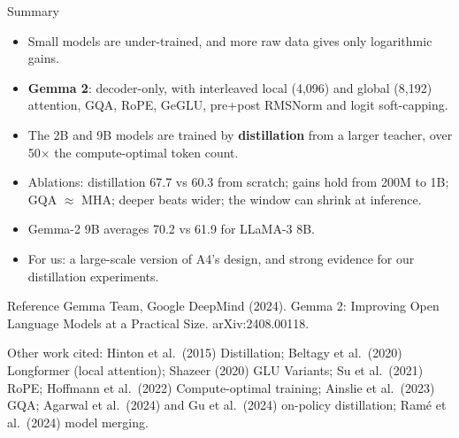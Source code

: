 \documentclass[aspectratio=169,11pt]{beamer}
\begin{document}
\begin{frame}{Summary}
  \begin{itemize}
    \item Small models are under-trained, and more raw data gives only logarithmic gains.
    \item \textbf{Gemma 2}: decoder-only, with interleaved local (4,096) and global (8,192) attention, GQA, RoPE, GeGLU, pre+post RMSNorm and logit soft-capping.
    \item The 2B and 9B models are trained by \textbf{distillation} from a larger teacher, over 50$\times$ the compute-optimal token count.
    \item Ablations: distillation 67.7 vs 60.3 from scratch; gains hold from 200M to 1B; GQA $\approx$ MHA; deeper beats wider; the window can shrink at inference.
    \item Gemma-2 9B averages 70.2 vs 61.9 for LLaMA-3 8B.
    \item For us: a large-scale version of A4's design, and strong evidence for our distillation experiments.
  \end{itemize}
\end{frame}

\begin{frame}{Reference}
  \small
  Gemma Team, Google DeepMind (2024). Gemma 2: Improving Open Language Models at a Practical Size. arXiv:2408.00118.
  \vspace{3mm}

  {\footnotesize Other work cited: Hinton et al.\ (2015) Distillation; Beltagy et al.\ (2020) Longformer (local attention); Shazeer (2020) GLU Variants; Su et al.\ (2021) RoPE; Hoffmann et al.\ (2022) Compute-optimal training; Ainslie et al.\ (2023) GQA; Agarwal et al.\ (2024) and Gu et al.\ (2024) on-policy distillation; Ramé et al.\ (2024) model merging.}
\end{frame}
\end{document}
